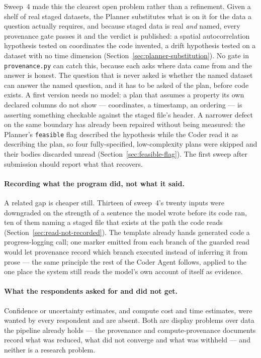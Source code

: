 Sweep~4 made this the clearest open problem rather than a refinement. Given a
shelf of real staged datasets, the Planner substitutes what is on it for the data
a question actually requires, and because staged data is real \emph{and} named,
every provenance gate passes it and the verdict is published: a spatial
autocorrelation hypothesis tested on coordinates the code invented, a drift
hypothesis tested on a dataset with no time dimension
(Section~\ref{sec:planner-substitution}). No gate in \texttt{provenance.py} can
catch this, because each asks where data came from and the answer is honest. The
question that is never asked is whether the named dataset can answer the named
question, and it has to be asked of the plan, before code exists. A first version
needs no model: a plan that assumes a property its own declared columns do not
show --- coordinates, a timestamp, an ordering --- is asserting something
checkable against the staged file's header. A narrower defect on the same
boundary has already been repaired without being measured: the Planner's
\texttt{feasible} flag described the hypothesis while the Coder read it as
describing the plan, so four fully-specified, low-complexity plans were skipped
and their bodies discarded unread (Section~\ref{sec:feasible-flag}). The first
sweep after submission should report what that recovers.

\paragraph{Recording what the program did, not what it said.} A related gap is
cheaper still. Thirteen of sweep~4's twenty inputs were downgraded on the strength
of a sentence the model wrote before its code ran, ten of them naming a staged file
that exists at the path the code reads (Section~\ref{sec:read-not-recorded}). The
template already hands generated code a progress-logging call; one marker emitted
from each branch of the guarded read would let provenance record which branch
executed instead of inferring it from prose --- the same principle the rest of the
Coder Agent follows, applied to the one place the system still reads the model's
own account of itself as evidence.

\paragraph{What the respondents asked for and did not get.} Confidence or
uncertainty estimates, and compute cost and time estimates, were wanted by every
respondent and are absent. Both are display problems over data the pipeline
already holds --- the provenance and compute-provenance documents record what was
reduced, what did not converge and what was withheld --- and neither is a research
problem.

